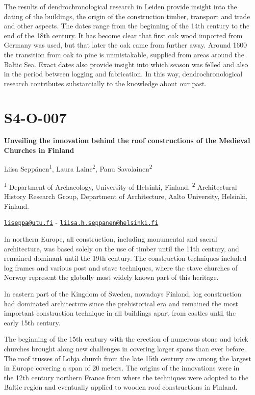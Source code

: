 \documentclass[
]{book}
\begin{document}
The results of dendrochronological research in Leiden provide insight into the dating of the buildings, the origin of the construction timber, transport and trade and other aspects. The dates range from the beginning of the 14th century to the end of the 18th century. It has become clear that first oak wood imported from Germany was used, but that later the oak came from further away. Around 1600 the transition from oak to pine is unmistakable, supplied from areas around the Baltic Sea. Exact dates also provide insight into which season was felled and also in the period between logging and fabrication. In this way, dendrochronological research contributes substantially to the knowledge about our past.

\hypertarget{s4-o-007}{%
\section*{S4-O-007}\label{s4-o-007}}

\textbf{Unveiling the innovation behind the roof constructions of the Medieval Churches in Finland}

Liisa Seppänen\textsuperscript{1}, Laura Laine\textsuperscript{2}, Panu Savolainen\textsuperscript{2}

\textsuperscript{1} Department of Archaeology, University of Helsinki, Finland. \textsuperscript{2} Architectural History Research Group, Department of Architecture, Aalto University, Helsinki, Finland.

\href{mailto:liseppa@utu.fi}{\nolinkurl{liseppa@utu.fi}} - \href{mailto:liisa.h.seppanen@helsinki.fi}{\nolinkurl{liisa.h.seppanen@helsinki.fi}}

In northern Europe, all construction, including monumental and sacral architecture, was based solely on the use of timber until the 11th century, and remained dominant until the 19th century. The construction techniques included log frames and various post and stave techniques, where the stave churches of Norway represent the globally most widely known part of this heritage.

In eastern part of the Kingdom of Sweden, nowadays Finland, log construction had dominated architecture since the prehistorical era and remained the most important construction technique in all buildings apart from castles until the early 15th century.

The beginning of the 15th century with the erection of numerous stone and brick churches brought along new challenges in covering larger spans than ever before. The roof trusses of Lohja church from the late 15th century are among the largest in Europe covering a span of 20 meters. The origins of the innovations were in the 12th century northern France from where the techniques were adopted to the Baltic region and eventually applied to wooden roof constructions in Finland.
\end{document}
